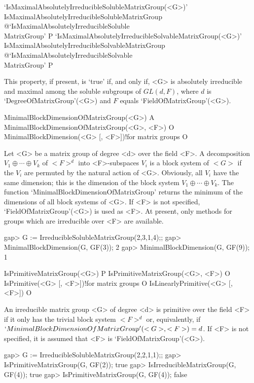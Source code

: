 \>`IsMaximalAbsolutelyIrreducibleSolubleMatrixGroup(<G>)'%
{IsMaximalAbsolutelyIrreducibleSolubleMatrixGroup}%
@{`IsMaximalAbsolutelyIrreducibleSoluble\\MatrixGroup'} P
\>`IsMaximalAbsolutelyIrreducibleSolvableMatrixGroup(<G>)'%
{IsMaximalAbsolutelyIrreducibleSolvableMatrixGroup}%
@{`IsMaximalAbsolutelyIrreducibleSolvable\\MatrixGroup'} P

This property, if present, is `true' if, and only if, <G> is absolutely irreducible and maximal among 
the soluble subgroups of $GL(d, F)$, where $d$ is `DegreeOfMatrixGroup'(<G>) and
$F$ equals `FieldOfMatrixGroup'(<G>). 


\>MinimalBlockDimensionOfMatrixGroup(<G>) A
\>MinimalBlockDimensionOfMatrixGroup(<G>, <F>) O
\>MinimalBlockDimension(<G> [, <F>])!{for matrix groups} O

Let <G> be a matrix group of degree <d> over the field <F>.  A 
decomposition $V_1 \oplus \cdots \oplus V_k$ of $<F>^d$ into <F>-subspaces
$V_i$ is a block system of $<G>$ if the $V_i$ are permuted by the natural
action of <G>. Obviously, all $V_i$ have the same dimension; this is the
dimension of the block system
$V_1 \oplus \cdots \oplus V_k$. The function
`MinimalBlockDimensionOfMatrixGroup' returns the minimum of the dimensions
of all block systems of <G>. If <F> is not specified, `FieldOfMatrixGroup'(<G>)
 is used as <F>. At present, only methods for groups 
which are irreducible over <F> are available.

\beginexample
gap> G := IrreducibleSolubleMatrixGroup(2,3,1,4);;
gap> MinimalBlockDimension(G, GF(3));
2
gap> MinimalBlockDimension(G, GF(9));
1
\endexample

\>IsPrimitiveMatrixGroup(<G>) P
\>IsPrimitiveMatrixGroup(<G>, <F>) O
\>IsPrimitive(<G> [, <F>])!{for matrix groups} O
\>IsLinearlyPrimitive(<G> [, <F>]) O

An irreducible matrix group <G> of degree <d> is primitive over the field <F> if it
only has the trivial block system $<F>^d$ or, equivalently, if
$`MinimalBlockDimensionOfMatrixGroup'(<G>, <F>) = d$. If <F> is not
specified, it is assumed that <F> is `FieldOfMatrixGroup'(<G>).

\beginexample
gap> G := IrreducibleSolubleMatrixGroup(2,2,1,1);;
gap> IsPrimitiveMatrixGroup(G, GF(2));
true
gap> IsIrreducibleMatrixGroup(G, GF(4));
true
gap> IsPrimitiveMatrixGroup(G, GF(4));
false
\endexample

